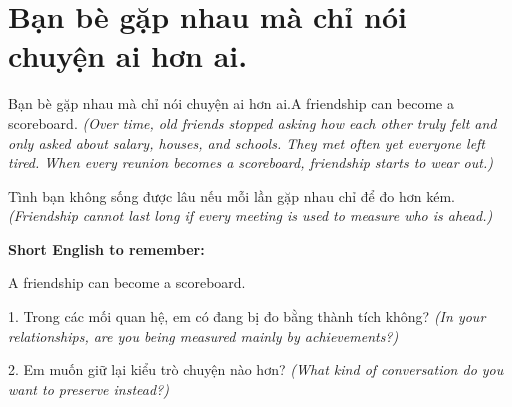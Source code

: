 \section{Bạn bè gặp nhau mà chỉ nói chuyện ai hơn ai.}
\begin{truyen}{Bạn bè gặp nhau mà chỉ nói chuyện ai hơn ai.}{A friendship can become a scoreboard.}
\textit{(Over time, old friends stopped asking how each other truly felt and only asked about salary, houses, and schools. They met often yet everyone left tired. When every reunion becomes a scoreboard, friendship starts to wear out.)}
\end{truyen}
\begin{baihoc}
Tình bạn không sống được lâu nếu mỗi lần gặp nhau chỉ để đo hơn kém.
\textit{(Friendship cannot last long if every meeting is used to measure who is ahead.)}
\end{baihoc}
\begin{ghinhoanh}\textbf{Short English to remember:}

A friendship can become a scoreboard.
\end{ghinhoanh}
\begin{tuhocnhanh}
1. Trong các mối quan hệ, em có đang bị đo bằng thành tích không? \textit{(In your relationships, are you being measured mainly by achievements?)}

2. Em muốn giữ lại kiểu trò chuyện nào hơn? \textit{(What kind of conversation do you want to preserve instead?)}
\end{tuhocnhanh}
\ngancach

